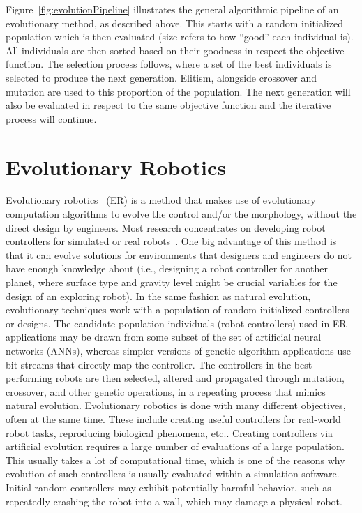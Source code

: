 Figure~\ref{fig:evolutionPipeline} illustrates the general algorithmic pipeline of an evolutionary method, as described above. This starts with a random initialized population which is then evaluated (size refers to how ``good'' each individual is). All individuals are then sorted based on their goodness in respect the objective function. The selection process follows, where a set of the best individuals is selected to produce the next generation. Elitism, alongside crossover and mutation are used to this proportion of the population. The next generation will also be evaluated in respect to the same objective function and the iterative process will continue.

\section{Evolutionary Robotics}
\label{sec:evolutionary_robotics}

Evolutionary robotics~\citep{nolfi2001evolutionary} (ER) is a method that makes use of evolutionary computation algorithms to evolve the control and/or the morphology, without the direct design by engineers. Most research concentrates on developing robot controllers for simulated or real robots~\citep{harvey1997evolutionary,nolfi1994evolve}. One big advantage of this method is that it can evolve solutions for environments that designers and engineers do not have enough knowledge about (i.e., designing a robot controller for another planet, where surface type and gravity level might be crucial variables for the design of an exploring robot). In the same fashion as natural evolution, evolutionary techniques work with a population of random initialized controllers or designs. The candidate population individuals (robot controllers) used in ER applications may be drawn from some subset of the set of artificial neural networks (ANNs), whereas simpler versions of genetic algorithm applications use bit-streams that directly map the controller. The controllers in the best performing robots are then selected, altered and propagated through mutation, crossover, and other genetic operations, in a repeating process that mimics natural evolution. Evolutionary robotics is done with many different objectives, often at the same time. These include creating useful controllers for real-world robot tasks, reproducing biological phenomena, etc.. Creating controllers via artificial evolution requires a large number of evaluations of a large population. This usually takes a lot of computational time, which is one of the reasons why evolution of such controllers is usually evaluated within a simulation software. Initial random controllers may exhibit potentially harmful behavior, such as repeatedly crashing the robot into a wall, which may damage a physical robot.

